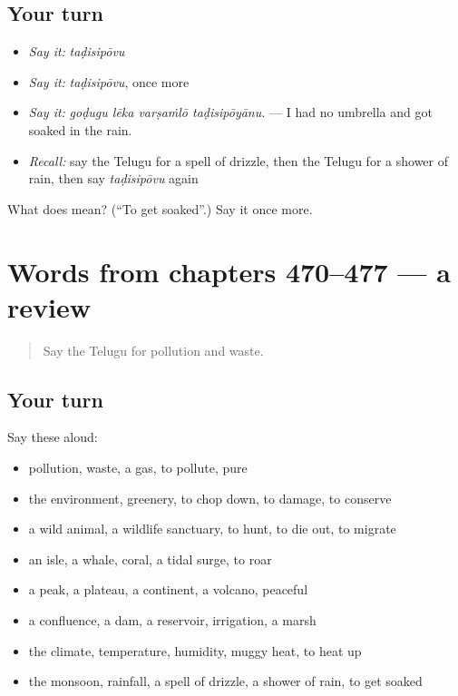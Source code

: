 \subsection*{Your turn}
\begin{itemize}
\raggedright
  \item \emph{Say it:} \emph{taḍisipōvu}
  \item \emph{Say it:} \emph{taḍisipōvu}, once more
  \item \emph{Say it:} \emph{goḍugu lēka varṣaṁlō taḍisipōyānu.} — I had no umbrella and got soaked in the rain.
  \item \emph{Recall:} say the Telugu for a spell of drizzle, then the Telugu for a shower of rain, then say \emph{taḍisipōvu} again
\end{itemize}

\begin{tcolorbox}[breakable,colback=teal!4,colframe=teal!35!black,title={Before you move on}]
What does  mean? (\textquotedblleft{}To get soaked\textquotedblright{}.) Say it once more.
\end{tcolorbox}
\section[(dialogue)]{Words from chapters 470–477 — a review}

\label{lesson:TE-R477-review-470-477}



\begin{quote}
Say the Telugu for pollution and waste.
\end{quote}

\subsection*{Your turn}
Say these aloud:

\begin{itemize}
\raggedright
  \item pollution, waste, a gas, to pollute, pure
  \item the environment, greenery, to chop down, to damage, to conserve
  \item a wild animal, a wildlife sanctuary, to hunt, to die out, to migrate
  \item an isle, a whale, coral, a tidal surge, to roar
  \item a peak, a plateau, a continent, a volcano, peaceful
  \item a confluence, a dam, a reservoir, irrigation, a marsh
  \item the climate, temperature, humidity, muggy heat, to heat up
  \item the monsoon, rainfall, a spell of drizzle, a shower of rain, to get soaked
\end{itemize}

